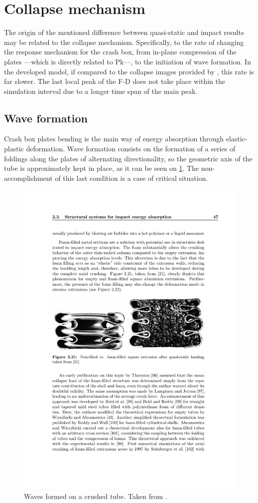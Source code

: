 \documentclass[cmfonts]{witpress}
\begin{document}
\section{Collapse mechanism}

The origin of the mentioned difference between quasi-static and impact results may be related to the collapse mechanism. Specifically, to the rate of changing the response mechanism for the crash box, from in-plane compression of the plates ---which is directly related to Pk---, to the initiation of wave formation. In the developed model, if compared to the collapse images provided by \cite{Scattina2011}, this rate is far slower. The last local peak of the F-D does not take place within the simulation interval due to a longer time span of the main peak.

\subsection{Wave formation}
\label{sec:wave_formation}

Crash box plates bending is the main way of energy absorption through elastic-plastic deformation. Wave formation consists on the formation of a series of foldings along the plates of alternating directionality, so the geometric axis of the tube is approximately kept in place, as it can be seen on \cref{fig:waves}. The non-accomplishment of this last condition is a case of critical situation.

\begin{figure}
\centering
\includegraphics[width=0.7\linewidth]{figures/IMG_CUTRES/waves}
\caption[Waves formed on a crushed tube.]{Waves formed on a crushed tube. Taken from \cite{Langseth}.}
\label{fig:waves}
\end{figure}
\end{document}
